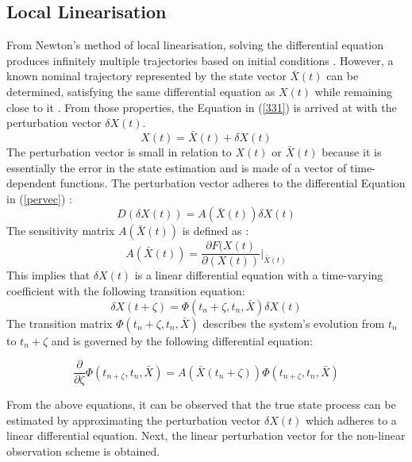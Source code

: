 \subsection{Local Linearisation}
From Newton's method of local linearisation, solving the differential equation produces infinitely multiple trajectories based on initial conditions \cite{Inggs1}. However, a known nominal trajectory represented by the state vector \( \bar{X}(t)\) can be determined, satisfying the same differential equation as \(X(t)\) while remaining close to it \cite{Inggs1}. From those properties, the Equation in (\ref{331}) is arrived at with the perturbation vector \(\delta X(t) \).
\begin{equation}
    X(t) =  \bar{X}(t) + \delta X(t)
    \label{331}
\end{equation}
The perturbation vector is small in relation to \(X(t)\)  or \(\bar{X}(t)\) because it is essentially the error in the state estimation and is made of a vector of time-dependent functions. The perturbation vector adheres to the differential Equation in (\ref{pervec}) \cite{Inggs1}:
\begin{equation}
        D(\delta X(t)) =  A(\bar{X}(t))\delta X(t)
        \label{pervec}
\end{equation}
The sensitivity matrix \(A(\bar{X}(t)) \) is defined as : 
\begin{equation}
        A(\bar{X}(t)) = \frac{\partial F(X(t)}{\partial (X(t))}|_{\bar{X}(t)}
\end{equation}
This implies that \(\delta X(t)\) is a linear differential equation with a time-varying coefficient with the following transition equation:
\begin{equation}
    \delta X(t+\zeta) = \Phi (t_n+\zeta,t_n,\bar{X})\delta X(t)
\end{equation}
The transition matrix \(\Phi (t_n+\zeta,t_n,\bar{X})\) describes the system's evolution from \(t_n\) to \(t_n+\zeta\) and is governed by the following differential equation:

\begin{equation}
    \frac{\partial}{\partial \zeta} \Phi(t_{n+\zeta},t_n,\bar{X}) = A(\bar{X}(t_n+\zeta))\Phi(t_{n+\zeta},t_n,\bar{X})
\end{equation}

From the above equations, it can be observed that the true state process can be estimated by approximating the perturbation vector \(\delta X(t)\) which adheres to a linear differential equation. Next, the linear perturbation vector for the non-linear observation scheme is obtained.

